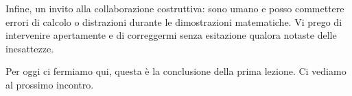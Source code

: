     Infine, un invito alla collaborazione costruttiva: sono umano e posso commettere errori di calcolo o distrazioni durante le dimostrazioni matematiche. Vi prego di intervenire apertamente e di correggermi senza esitazione qualora notaste delle inesattezze.
    
    Per oggi ci fermiamo qui, questa è la conclusione della prima lezione. Ci vediamo al prossimo incontro.
